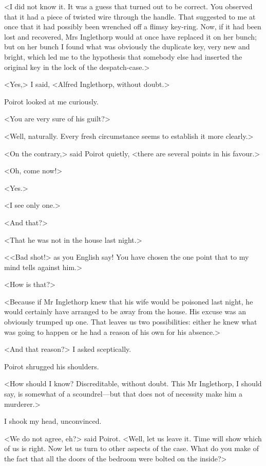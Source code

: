  <I did not know it. It was a guess that turned out to be correct. You observed that it had a piece of twisted wire through the handle. That suggested to me at once that it had possibly been wrenched off a flimsy key-ring. Now, if it had been lost and recovered, Mrs Inglethorp would at once have replaced it on her bunch; but on her bunch I found what was obviously the duplicate key, very new and bright, which led me to the hypothesis that somebody else had inserted the original key in the lock of the despatch-case.> 

 <Yes,> I said, <Alfred Inglethorp, without doubt.> 

 Poirot looked at me curiously. 

 <You are very sure of his guilt?> 

 <Well, naturally. Every fresh circumstance seems to establish it more clearly.> 

 <On the contrary,> said Poirot quietly, <there are several points in his favour.> 

 <Oh, come now!> 

 <Yes.> 

 <I see only one.> 

 <And that?> 

 <That he was not in the house last night.> 

 <<Bad shot!> as you English say! You have chosen the one point that to my mind tells against him.> 

 <How is that?> 

 <Because if Mr Inglethorp knew that his wife would be poisoned last night, he would certainly have arranged to be away from the house. His excuse was an obviously trumped up one. That leaves us two possibilities: either he knew what was going to happen or he had a reason of his own for his absence.> 

 <And that reason?> I asked sceptically. 

 Poirot shrugged his shoulders. 

 <How should I know? Discreditable, without doubt. This Mr Inglethorp, I should say, is somewhat of a scoundrel—but that does not of necessity make him a murderer.> 

 I shook my head, unconvinced. 

 <We do not agree, eh?> said Poirot. <Well, let us leave it. Time will show which of us is right. Now let us turn to other aspects of the case. What do you make of the fact that all the doors of the bedroom were bolted on the inside?> 

